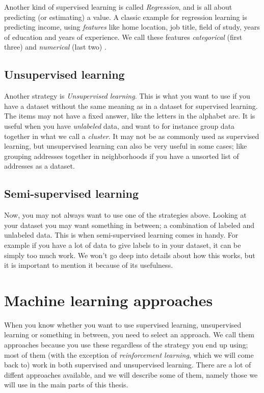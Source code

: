 Another kind of supervised learning is called \textit{Regression}, and is all about predicting (or estimating) a value. 
A classic example for regression learning is predicting income, using \textit{features} like home location, job title, field of study,  
years of education and years of experience. We call these features \textit{categorical} (first three) and \textit{numerical} (last two) 
\cite{machine_learning_for_humans_supervised_1}. 

\subsection{Unsupervised learning}
Another strategy is \textit{Unsupervised learning}. This is what you want to use if you have a dataset without the same meaning 
as in a dataset for supervised learning. The items may not have a fixed answer, like the letters in the alphabet are. 
It is useful when you have \textit{unlabeled} data, and want to for instance group data together in what we call a \textit{cluster}.
It may not be as commonly used as supervised learning, but unsupervised learning can also be very useful in some cases; like grouping addresses together
in neighborhoods if you have a unsorted list of addresses as a dataset.

\subsection{Semi-supervised learning}
Now, you may not always want to use one of the strategies above. Looking at your dataset you may want something in between; 
a combination of labeled and unlabeled data. This is when semi-supervised learning comes in handy. For example if you have 
a lot of data to give labels to in your dataset, it can be simply too much work. We won't go deep into details about how this works, 
but it is important to mention it because of its usefulness.


\section{Machine learning approaches}
When you know whether you want to use supervised learning, unsupervised learning or something in between, you need to select an approach.
We call them approaches because you use these regardless of the strategy you end up using; most of them (with the exception of \textit{reinforcement learning}, 
which we will come back to) work in both supervised and unsupervised learning. There are a lot of diffent approaches available, and we will describe some of them,
namely those we will use in the main parts of this thesis.

